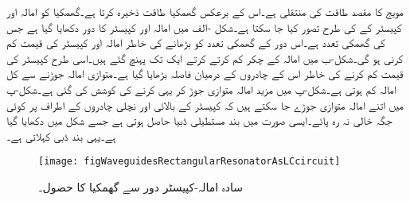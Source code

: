 مویج کا مقصد طاقت کی منتقلی ہے۔اس کے برعکس گھمکیا طاقت ذخیرہ کرتا ہے۔گھمکیا کو امالہ اور کپیسٹر کے  کی طرح تصور کیا جا سکتا ہے۔شکل -الف میں امالہ اور کپیسٹر کا دور  دکھایا گیا ہے  جس کی گھمکی تعدد  ہے۔اس دور کے گھمکی تعدد کو بڑھانے کی خاطر امالہ اور کپیسٹر کی قیمت کم کرنی ہو گی۔شکل-ب میں امالہ کے چکر کم کرتے کرتے ایک تک پہنچ گئے ہیں۔اسی طرح کپیسٹر کی قیمت کم کرنے کی خاطر اس کے چادروں کے درمیان فاصلہ بڑھایا گیا ہے۔متوازی امالہ جوڑنے سے کل امالہ کم ہوتی ہے۔شکل-پ میں مزید امالہ متوازی جوڑ کر یہی کرنے کی کوشش کی گئی ہے۔شکل-پ میں اتنے امالہ متوازی جوڑے جا سکتے ہیں کہ کپیسٹر کے بالائی اور نچلی چادروں کے اطراف پر کوئی جگہ خالی نہ رہ پائے۔ایسی صورت میں بند مستطیلی ڈبیا حاصل ہوتی ہے جسے شکل  میں دکھایا گیا ہے۔یہی بند ڈبی   کہلاتی ہے۔ 

\begin{figure}
\centering
\texttt{[image: figWaveguidesRectangularResonatorAsLCcircuit]}
\caption{سادہ امالہ-کپیسٹر دور سے گھمکیا کا حصول۔}
\label{شکل_مویج_امالہ_کپیسٹر_سے_گھمکیا}
\end{figure}

